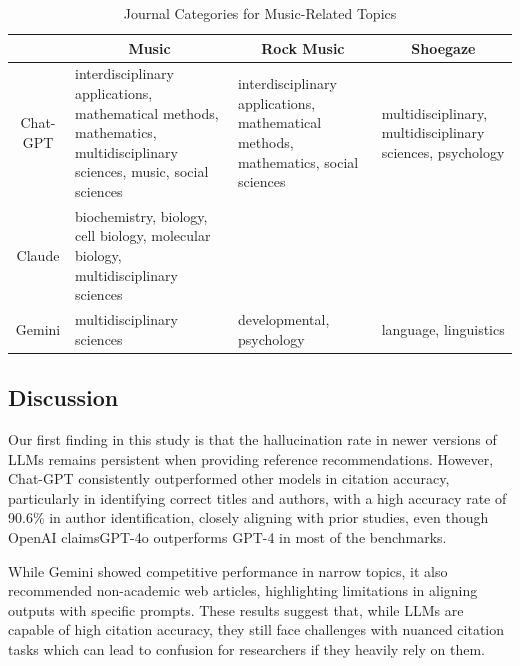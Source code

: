 \documentclass[runningheads]{llncs}
\begin{document}
\begin{table}[ht]
\centering
\scriptsize
\begin{tabular}{|c|p{3cm}|p{3cm}|p{3cm}|}
\hline
 & \multicolumn{1}{c|}{\textbf{Music}} & \multicolumn{1}{c|}{\textbf{Rock Music}} & \multicolumn{1}{c|}{\textbf{Shoegaze}} \\ \hline
Chat-GPT & interdisciplinary applications, mathematical methods, mathematics, multidisciplinary sciences, music, social sciences & interdisciplinary applications, mathematical methods, mathematics, social sciences & multidisciplinary, multidisciplinary sciences, psychology \\ \hline
Claude & biochemistry, biology, cell biology, molecular biology, multidisciplinary sciences &  &  \\ \hline
Gemini & multidisciplinary sciences & developmental, psychology & language, linguistics \\ \hline
\end{tabular}
\caption{Journal Categories for Music-Related Topics}
\label{tab:music_topics}
\end{table}


\subsection{Discussion}


Our first finding in this study is that the hallucination rate in newer versions of LLMs remains persistent when providing reference recommendations. However, Chat-GPT consistently outperformed other models in citation accuracy, particularly in identifying correct titles and authors, with a high accuracy rate of 90.6\% in author identification, closely aligning with prior studies, even though OpenAI claims\footnotemark[1] GPT-4o outperforms GPT-4 in most of the benchmarks. 


While Gemini showed competitive performance in narrow topics, it also recommended non-academic web articles, highlighting limitations in aligning outputs with specific prompts. These results suggest that, while LLMs are capable of high citation accuracy, they still face challenges with nuanced citation tasks which can lead to confusion for researchers if they heavily rely on them.

\end{document}
